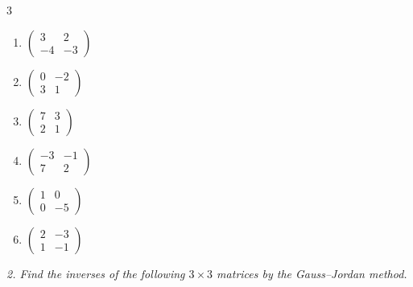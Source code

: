 \begin{multicols}{3}
\begin{enumerate}[label=\arabic*.,  leftmargin=*]
\item $\begin{pmatrix}3&2\\-4&-3\end{pmatrix}$
\item $\begin{pmatrix}0&-2\\3&1\end{pmatrix}$
\item $\begin{pmatrix}7&3\\2&1\end{pmatrix}$
\item $\begin{pmatrix}-3&-1\\7&2\end{pmatrix}$
\item $\begin{pmatrix}1&0\\0&-5\end{pmatrix}$
\item $\begin{pmatrix}2&-3\\1&-1\end{pmatrix}$
\end{enumerate}
\end{multicols}
\emph{2. Find the inverses of the following $3\times 3$ matrices by the
Gauss–Jordan method.}
\bigskip
